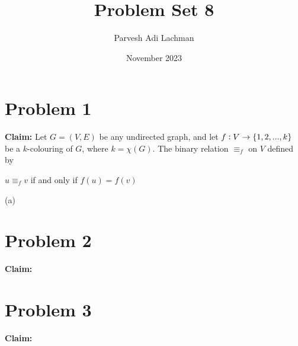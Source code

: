 \documentclass{article}
\title{Problem Set 8}
\author{Parvesh Adi Lachman}
\date{November 2023}
\begin{document}
\maketitle

\section{Problem 1}
\noindent\textbf{Claim:} Let $G=(V,E)$ be any undirected graph, and let $f\vcentcolon V\rightarrow \{1,2,...,k\}$ be a $k$-colouring of $G$, where $k=\chi (G)$. The binary relation $\equiv_f$ on $V$ defined by
\begin{center}
	$u\equiv_f v$ if and only if $f(u)=f(v)$
\end{center}
\vspace{10pt}


(a)




\pagebreak
\section{Problem 2}
\noindent\textbf{Claim:} 





\pagebreak
\section{Problem 3}
\noindent\textbf{Claim:}  




\pagebreak
\end{document}
